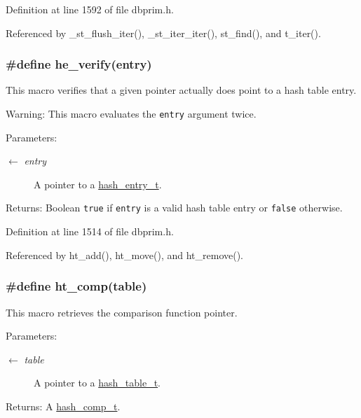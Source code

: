 Definition at line 1592 of file dbprim.h.

Referenced by \_\-st\_\-flush\_\-iter(), \_\-st\_\-iter\_\-iter(), st\_\-find(), and t\_\-iter().\hypertarget{group__dbprim__hash_ga38}{
\subsubsection[he\_\-verify]{\setlength{\rightskip}{0pt plus 5cm}\#define he\_\-verify(entry)}}
\label{group__dbprim__hash_ga38}


This macro verifies that a given pointer actually does point to a hash table entry.

\begin{Desc}
\item[Warning:]This macro evaluates the {\tt entry} argument twice.\end{Desc}
\begin{Desc}
\item[Parameters:]
\begin{description}
\item[\mbox{$\leftarrow$} {\em entry}]A pointer to a \hyperlink{group__dbprim__hash_ga2}{hash\_\-entry\_\-t}.\end{description}
\end{Desc}
\begin{Desc}
\item[Returns:]Boolean {\tt true} if {\tt entry} is a valid hash table entry or {\tt false} otherwise.\end{Desc}


Definition at line 1514 of file dbprim.h.

Referenced by ht\_\-add(), ht\_\-move(), and ht\_\-remove().\hypertarget{group__dbprim__hash_ga32}{
\subsubsection[ht\_\-comp]{\setlength{\rightskip}{0pt plus 5cm}\#define ht\_\-comp(table)}}
\label{group__dbprim__hash_ga32}


This macro retrieves the comparison function pointer.

\begin{Desc}
\item[Parameters:]
\begin{description}
\item[\mbox{$\leftarrow$} {\em table}]A pointer to a \hyperlink{group__dbprim__hash_ga1}{hash\_\-table\_\-t}.\end{description}
\end{Desc}
\begin{Desc}
\item[Returns:]A \hyperlink{group__dbprim__hash_ga5}{hash\_\-comp\_\-t}.\end{Desc}


